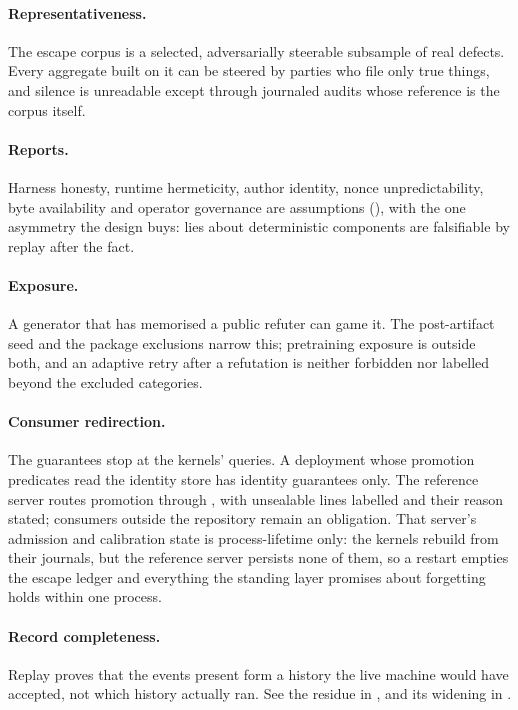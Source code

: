 \documentclass[11pt,a4paper]{article}
\theoremstyle{plain}
\theoremstyle{definition}
\theoremstyle{remark}
\begin{document}
\paragraph{Representativeness.} The escape corpus is a selected, adversarially steerable subsample of real defects. Every aggregate built on it can be steered by parties who file only true things, and silence is unreadable except through journaled audits whose reference is the corpus itself.

\paragraph{Reports.} Harness honesty, runtime hermeticity, author identity, nonce unpredictability, byte availability and operator governance are assumptions (), with the one asymmetry the design buys: lies about deterministic components are falsifiable by replay after the fact.

\paragraph{Exposure.} A generator that has memorised a public refuter can game it. The post-artifact seed and the package exclusions narrow this; pretraining exposure is outside both, and an adaptive retry after a refutation is neither forbidden nor labelled beyond the excluded categories.

\paragraph{Consumer redirection.} The guarantees stop at the kernels' queries. A deployment whose promotion predicates read the identity store has identity guarantees only. The reference server routes promotion through , with unsealable lines labelled and their reason stated; consumers outside the repository remain an obligation. That server's admission and calibration state is process-lifetime only: the kernels rebuild from their journals, but the reference server persists none of them, so a restart empties the escape ledger and everything the standing layer promises about forgetting holds within one process.

\paragraph{Record completeness.} Replay proves that the events present form a history the live machine would have accepted, not which history actually ran. See the residue in , and its widening in .
\end{document}
